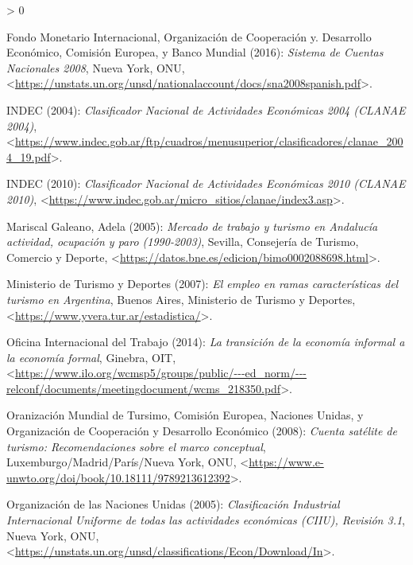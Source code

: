 \documentclass[
  openany]{book}
\newlength{\cslhangindent}
\newenvironment{CSLReferences}[2] %
 {%
  \setlength{\parindent}{0pt}
  \ifodd #1 \everypar{\setlength{\hangindent}{\cslhangindent}}\ignorespaces\fi
  \ifnum #2 > 0
  \setlength{\parskip}{#2\baselineskip}
  \fi
 }%
 {}
\begin{document}
\hypertarget{refs}{}
\begin{CSLReferences}{1}{0}
\leavevmode\hypertarget{ref-scn2008}{}%
Fondo Monetario Internacional, Organización de Cooperación y. Desarrollo Económico, Comisión Europea, y Banco Mundial (2016): \emph{Sistema de Cuentas Nacionales 2008}, Nueva York, ONU, \textless{}\url{https://unstats.un.org/unsd/nationalaccount/docs/sna2008spanish.pdf}\textgreater.

\leavevmode\hypertarget{ref-clanae04}{}%
INDEC (2004): \emph{Clasificador Nacional de Actividades Económicas 2004 (CLANAE 2004)}, \textless{}\url{https://www.indec.gob.ar/ftp/cuadros/menusuperior/clasificadores/clanae_2004_19.pdf}\textgreater.

\leavevmode\hypertarget{ref-clanae10}{}%
INDEC (2010): \emph{Clasificador Nacional de Actividades Económicas 2010 (CLANAE 2010)}, \textless{}\url{https://www.indec.gob.ar/micro_sitios/clanae/index3.asp}\textgreater.

\leavevmode\hypertarget{ref-mariscal2005}{}%
Mariscal Galeano, Adela (2005): \emph{Mercado de trabajo y turismo en Andalucía actividad, ocupación y paro (1990-2003)}, Sevilla, Consejería de Turismo, Comercio y Deporte, \textless{}\url{https://datos.bne.es/edicion/bimo0002088698.html}\textgreater.

\leavevmode\hypertarget{ref-mintur2007}{}%
Ministerio de Turismo y Deportes (2007): \emph{El empleo en ramas características del turismo en Argentina}, Buenos Aires, Ministerio de Turismo y Deportes, \textless{}\url{https://www.yvera.tur.ar/estadistica/}\textgreater.

\leavevmode\hypertarget{ref-oitconferencia14}{}%
Oficina Internacional del Trabajo (2014): \emph{La transición de la economía informal a la economía formal}, Ginebra, OIT, \textless{}\url{https://www.ilo.org/wcmsp5/groups/public/---ed_norm/---relconf/documents/meetingdocument/wcms_218350.pdf}\textgreater.

\leavevmode\hypertarget{ref-cstrmc2008}{}%
Oranización Mundial de Tursimo, Comisión Europea, Naciones Unidas, y Organización de Cooperación y Desarrollo Económico (2008): \emph{Cuenta satélite de turismo: Recomendaciones sobre el marco conceptual}, Luxemburgo/Madrid/París/Nueva York, ONU, \textless{}\url{https://www.e-unwto.org/doi/book/10.18111/9789213612392}\textgreater.

\leavevmode\hypertarget{ref-ciiurev3_1}{}%
Organización de las Naciones Unidas (2005): \emph{Clasificación Industrial Internacional Uniforme de todas las actividades económicas (CIIU), Revisión 3.1}, Nueva York, ONU, \textless{}\url{https://unstats.un.org/unsd/classifications/Econ/Download/In}\textgreater.


\end{CSLReferences}
\end{document}
